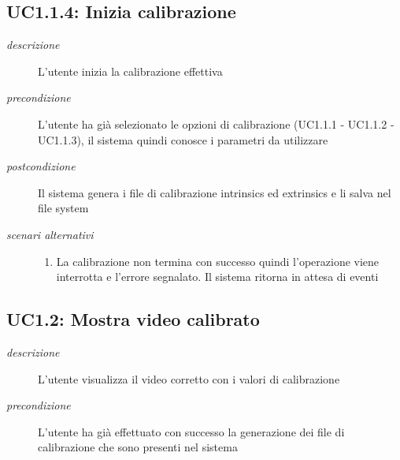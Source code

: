 \subsection{UC1.1.4: Inizia calibrazione} \label{sec:UC1.1.4}
\begin{description}
\item[\em{descrizione }]L'utente inizia la calibrazione effettiva
\item[\em{precondizione }] L'utente ha già selezionato le opzioni di calibrazione (UC1.1.1 - UC1.1.2 - UC1.1.3), il sistema quindi conosce i parametri da utilizzare
\item[\em{postcondizione }] Il sistema genera i file di calibrazione intrinsics ed extrinsics e li salva nel file system
\item[\em{scenari alternativi }] \mbox{} 
\begin{enumerate} 
\item La calibrazione non termina con successo quindi l'operazione viene interrotta e l'errore segnalato. Il sistema ritorna in attesa di eventi
\end{enumerate}
\end{description}

\subsection{UC1.2: Mostra video calibrato} \label{sec:UC1.2}
\begin{description}
\item[\em{descrizione }]L'utente visualizza il video corretto con i valori di calibrazione
\item[\em{precondizione }] L'utente ha già effettuato con successo la generazione dei file di calibrazione che sono presenti nel sistema
\end{description}

